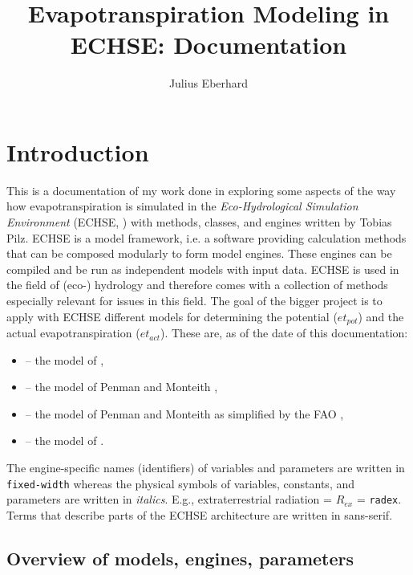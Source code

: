 \documentclass{scrreprt}
\title{Evapotranspiration Modeling in ECHSE: Documentation}
\author{Julius Eberhard}
\newenvironment{denseitem}{
  \begin{itemize}
    \setlength{\itemsep}{0pt}
    \setlength{\parskip}{0pt}
    \setlength{\parsep}{0pt}
}{
  \end{itemize}
}
\begin{document}
\maketitle
\tableofcontents


\chapter{Introduction} \label{ch:introduction}

This is a documentation of my work done in exploring some aspects of the way how evapotranspiration is simulated in the \emph{Eco-Hydrological Simulation Environment} (ECHSE, \citealt{kneis15}) with methods, classes, and engines written by Tobias Pilz.
ECHSE is a model framework, i.e. a software providing calculation methods that can be composed modularly to form model engines. These engines can be compiled and be run as independent models with input data.
ECHSE is used in the field of (eco-) hydrology and therefore comes with a collection of methods especially relevant for issues in this field.
The goal of the bigger project is to apply with ECHSE different models for determining the potential ($et_{pot}$) and the actual evapotranspiration ($et_{act}$).
These are, as of the date of this documentation:
\begin{denseitem}
  \item[--] the model of \citet{makkink57},
  \item[--] the model of Penman and Monteith \citep{monteith65},
  \item[--] the model of Penman and Monteith as simplified by the FAO \citep{fao98},
  \item[--] the model of \citet{shuttleworth85}.
\end{denseitem}

The engine-specific names (identifiers) of variables and parameters are written in \verb!fixed-width! whereas the physical symbols of variables, constants, and parameters are written in \textit{italics}.
E.g., extraterrestrial radiation = $R_{ex}$ = \verb!radex!.
Terms that describe parts of the ECHSE architecture are written in \textsf{sans-serif}.

\newpage
\section{Overview of models, engines, parameters} \label{sec:intro_overview}
\end{document}
